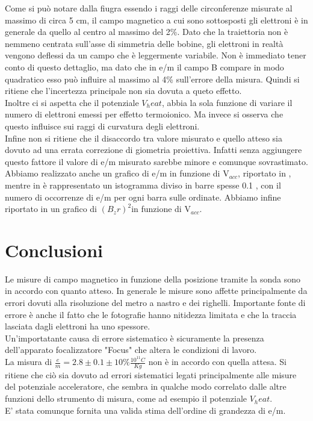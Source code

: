 Come si può notare dalla fiugra  essendo i raggi delle circonferenze misurate al massimo di circa 5 cm, il campo magnetico a cui sono sottosposti gli elettroni è in generale da quello al centro al massimo del 2\%. Dato che la traiettoria non è nemmeno centrata sull'asse di simmetria delle bobine, gli elettroni in realtà vengono deflessi da un campo che è leggermente variabile. Non è immediato tener conto di questo dettaglio, ma dato che in e/m il campo B compare in modo quadratico esso può influire al massimo al 4\% sull'errore della misura. Quindi si ritiene che l'incertezza principale non sia dovuta a queto effetto. \\
Inoltre ci si aspetta che il potenziale $V_heat$, abbia la sola funzione di variare il numero di elettroni emessi per effetto termoionico. Ma invece si osserva che questo influisce sui raggi di curvatura degli elettroni.\\
Infine non si ritiene che il disaccordo tra valore misurato e quello atteso sia dovuto ad una errata correzione di giometria proiettiva. Infatti senza aggiungere questo fattore il valore di e/m misurato sarebbe minore e comunque sovrastimato.
Abbiamo realizzato anche un grafico di e/m in funzione di V$_{acc}$, riportato in , mentre in  è rappresentato un istogramma diviso in barre spesse 0.1 , con il numero di occorrenze di e/m per ogni barra sulle ordinate. Abbiamo infine riportato in  un grafico di ${(B_z r)}^2$in funzione di V$_{acc}$.

\section{Conclusioni}
Le misure di campo magnetico in funzione della posizione tramite la sonda sono in accordo con quanto atteso.
In generale le misure sono affette principalmente da errori dovuti alla risoluzione del metro a nastro e dei righelli. Importante fonte di errore è anche il fatto che le fotografie hanno nitidezza limitata e che la traccia lasciata dagli elettroni ha uno spessore.\\
Un'importatante causa di errore sistematico è sicuramente la presenza dell'apparato focalizzatore "Focus" che altera le condizioni di lavoro.\\
La misura di $\frac{e}{m} = 2.8 \pm 0.1 \pm 10\% \frac{10^{11} C}{Kg}$ non è in accordo con quella attesa. Si ritiene che ciò sia dovuto ad errori sistematici legati principalmente alle misure del potenziale acceleratore, che sembra in qualche modo correlato dalle altre funzioni dello strumento di misura, come ad esempio il potenziale $V_heat$.\\
E' stata comunque fornita una valida stima dell'ordine di grandezza di e/m.